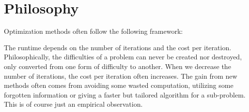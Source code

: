 
\section{Philosophy}

Optimization methods often follow the following framework:

\begin{algorithm2e}[H]

\caption{$\mathtt{OptimizationFramework}$}

\SetAlgoLined


\end{algorithm2e}

The runtime depends on the number of iterations and the cost per iteration.
Philosophically, the difficulties of a problem can never be created
nor destroyed, only converted from one form of difficulty to another.
When we decrease the number of iterations, the cost per iteration
often increases. The gain from new methods often comes from avoiding
some wasted computation, utilizing some forgotten information or giving
a faster but tailored algorithm for a sub-problem. This is of course
just an empirical observation.

